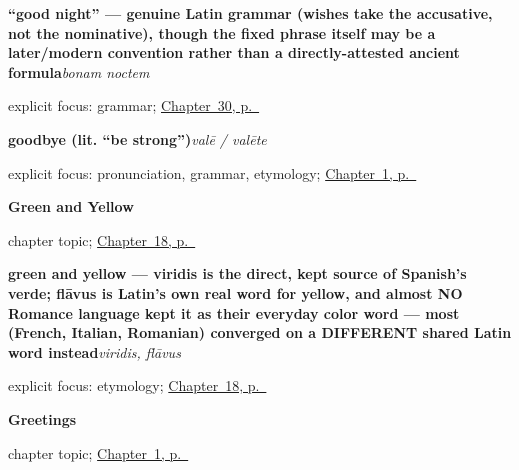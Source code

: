 \noindent\begin{minipage}[t]{\linewidth}
\raggedright
\textbf{\textquotedblleft{}good night\textquotedblright{} — genuine Latin grammar (wishes take the accusative, not the nominative), though the fixed phrase itself may be a later/modern convention rather than a directly-attested ancient formula}\enspace\emph{bonam noctem}\par
\footnotesize explicit focus: grammar; \hyperref[ch:la-good-night]{Chapter~30, p.~\pageref*{ch:la-good-night}}
\end{minipage}\par\smallskip

\noindent\begin{minipage}[t]{\linewidth}
\raggedright
\textbf{goodbye (lit. \textquotedblleft{}be strong\textquotedblright{})}\enspace\emph{valē / valēte}\par
\footnotesize explicit focus: pronunciation, grammar, etymology; \hyperref[ch:greetings]{Chapter~1, p.~\pageref*{ch:greetings}}
\end{minipage}\par\smallskip

\noindent\begin{minipage}[t]{\linewidth}
\raggedright
\textbf{Green and Yellow}\par
\footnotesize chapter topic; \hyperref[ch:la-green-and-yellow]{Chapter~18, p.~\pageref*{ch:la-green-and-yellow}}
\end{minipage}\par\smallskip

\noindent\begin{minipage}[t]{\linewidth}
\raggedright
\textbf{green and yellow — viridis is the direct, kept source of Spanish's verde; flāvus is Latin's own real word for yellow, and almost NO Romance language kept it as their everyday color word — most (French, Italian, Romanian) converged on a DIFFERENT shared Latin word instead}\enspace\emph{viridis, flāvus}\par
\footnotesize explicit focus: etymology; \hyperref[ch:la-green-and-yellow]{Chapter~18, p.~\pageref*{ch:la-green-and-yellow}}
\end{minipage}\par\smallskip

\noindent\begin{minipage}[t]{\linewidth}
\raggedright
\textbf{Greetings}\par
\footnotesize chapter topic; \hyperref[ch:greetings]{Chapter~1, p.~\pageref*{ch:greetings}}
\end{minipage}\par\smallskip

